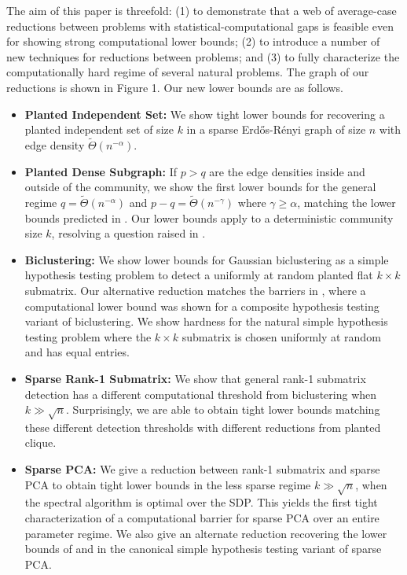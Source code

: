\documentclass[11pt]{article}
\begin{document}
The aim of this paper is threefold: (1) to demonstrate that a web of average-case reductions between problems with statistical-computational gaps is feasible even for showing strong computational lower bounds; (2) to introduce a number of new techniques for reductions between problems; and (3) to fully characterize the computationally hard regime of several natural problems. The graph of our reductions is shown in Figure 1. Our new lower bounds are as follows.
\begin{itemize}
\item \textbf{Planted Independent Set:} We show tight lower bounds for recovering a planted independent set of size $k$ in a sparse Erd\H{o}s-R\'{e}nyi graph of size $n$ with edge density $\tilde{\Theta}(n^{-\alpha})$.
\item \textbf{Planted Dense Subgraph:} If $p > q$ are the edge densities inside and outside of the community, we show the first lower bounds for the general regime $q = \tilde{\Theta}(n^{-\alpha})$ and $p - q = \tilde{\Theta}(n^{-\gamma})$ where $\gamma \ge \alpha$, matching the lower bounds predicted in \cite{chen2016statistical}. Our lower bounds apply to a deterministic community size $k$, resolving a question raised in \cite{hajek2015computational}.
\item \textbf{Biclustering:} We show lower bounds for Gaussian biclustering as a simple hypothesis testing problem to detect a uniformly at random planted flat $k \times k$ submatrix. Our alternative reduction matches the barriers in \cite{ma2015computational}, where a computational lower bound was shown for a composite hypothesis testing variant of biclustering. We show hardness for the natural simple hypothesis testing problem where the $k \times k$ submatrix is chosen uniformly at random and has equal entries.
\item \textbf{Sparse Rank-1 Submatrix:} We show that general rank-1 submatrix detection has a different computational threshold from biclustering when $k \gg \sqrt{n}$. Surprisingly, we are able to obtain tight lower bounds matching these different detection thresholds with different reductions from planted clique.
\item \textbf{Sparse PCA:} We give a reduction between rank-1 submatrix and sparse PCA to obtain tight lower bounds in the less sparse regime $k \gg \sqrt{n}$, when the spectral algorithm is optimal over the SDP. This yields the first tight characterization of a computational barrier for sparse PCA over an entire parameter regime. We also give an alternate reduction recovering the lower bounds of \cite{berthet2013complexity} and \cite{gao2017sparse} in the canonical simple hypothesis testing variant of sparse PCA.

\end{itemize}
\end{document}
